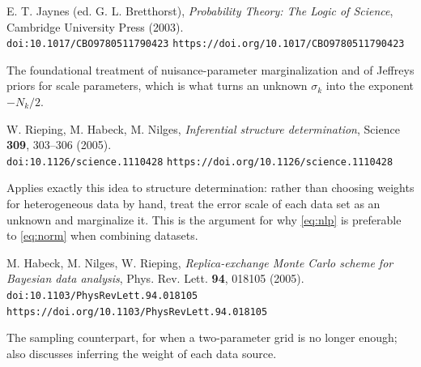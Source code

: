 \documentclass[11pt,a4paper]{article}
\begin{document}
E. T. Jaynes (ed. G. L. Bretthorst), \emph{Probability Theory: The Logic of
Science}, Cambridge University Press (2003). \\
\texttt{doi:10.1017/CBO9780511790423} \quad
\texttt{https://doi.org/10.1017/CBO9780511790423}

The foundational treatment of nuisance-parameter marginalization and of
Jeffreys priors for scale parameters, which is what turns an unknown
$\sigma_k$ into the exponent $-N_k/2$.

W. Rieping, M. Habeck, M. Nilges, \emph{Inferential structure
determination}, Science \textbf{309}, 303--306 (2005). \\
\texttt{doi:10.1126/science.1110428} \quad
\texttt{https://doi.org/10.1126/science.1110428}

Applies exactly this idea to structure determination: rather than choosing
weights for heterogeneous data by hand, treat the error scale of each data
set as an unknown and marginalize it. This is the argument for why
\eqref{eq:nlp} is preferable to \eqref{eq:norm} when combining datasets.

M. Habeck, M. Nilges, W. Rieping, \emph{Replica-exchange Monte Carlo scheme
for Bayesian data analysis}, Phys. Rev. Lett. \textbf{94}, 018105 (2005). \\
\texttt{doi:10.1103/PhysRevLett.94.018105} \quad
\texttt{https://doi.org/10.1103/PhysRevLett.94.018105}

The sampling counterpart, for when a two-parameter grid is no longer
enough; also discusses inferring the weight of each data source.
\end{document}
